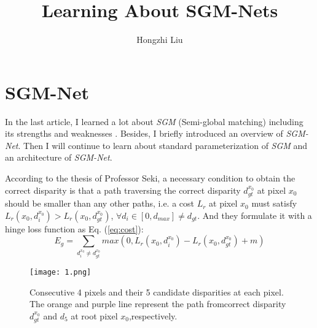 \documentclass[twocolumn]{article}
\author{Hongzhi Liu}
\title{Learning About SGM-Nets \uppercase\expandafter{\romannumeral2}}
\begin{document}
	\maketitle
	\par
	\section{SGM-Net}
	In the last article, I learned a lot about \emph{SGM} (Semi-global matching) including its strengths and weaknesses \cite{Seki2017SGM}. Besides, I briefly introduced  an overview of \emph{SGM-Net}. Then I will continue to learn about standard parameterization of \emph{SGM} and an architecture of \emph{SGM-Net}. 
	
	According to the thesis of Professor Seki, a necessary condition to obtain the correct disparity is that a path traversing the correct disparity
	$d_{gt}^{x_0}$ at pixel $x_0$ should be smaller than any other paths, i.e. a cost $L_r$ at pixel $x_0$ must satisfy $L_r \left( x_0, d_i^{x_0} \right) >L_r \left( x_0, d_{gt}^{x_0} \right)$, $\forall d_i \in \left[ 0,d_{max}\right] \ne d_{gt} $. And they formulate it with a hinge loss function as Eq. (\ref{eq:cost}):
	\begin{equation}
	E_g = \sum_{d_i^{x_0}\ne d_{gt}^{x_0}} max \left( 0,L_r \left( x_0, d_i^{x_0} \right) - L_r \left( x_0, d_{gt}^{x_0} \right) + m \right) \label{eq:cost}
	\end{equation}
	
    \begin{figure}[ht]
    	\centering
    	\texttt{[image: 1.png]}
    	\caption{Consecutive 4 pixels and their 5 candidate disparities at each pixel. The orange and purple line represent the path fromcorrect disparity $d_{gt}^{x_0}$ and $d_5$ at root pixel $x_0$,respectively.}\label{pathcost}
    \end{figure}
\end{document}
